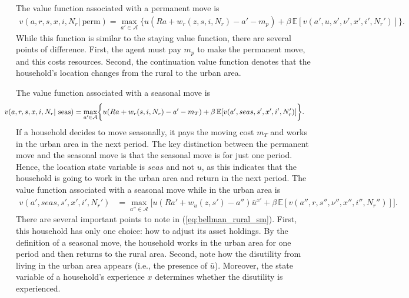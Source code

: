 \documentclass[12pt,pdftex]{article}
\begin{document}
The value function associated with a permanent move is
\begin{align}
v(a, r, s, x, i, N_r | \ \mbox{perm})  = \max_{a'\in \mathcal{A}} \bigg\{ u(Ra + w_r(z, s, i, N_r) - a' - m_{p} )  + \beta \, \mathbb{E} [v(a',u, s',\nu', x', i',N_r')] \bigg\}.
\nonumber
\end{align}
While this function is similar to the staying value function, there are several points of difference. First, the agent must pay $m_p$ to make the permanent move, and this costs resources. Second, the continuation value function denotes that the household's location changes from the rural to the urban area.

The value function associated with a seasonal move is
\begin{align}
\hspace{-0.60cm}v(a, r, s, x, i, N_r | \ \mbox{seas}) = \max_{a'\in \mathcal{A}}&\bigg\{ u(Ra + w_r(s, i, N_r) - a' - m_T ) + \beta \, \mathbb{E} [v(a',seas, s', x', i', N_r')] \bigg\}.
\label{eq:bellman_rural_seas_move}
\end{align}
If a household decides to move seasonally, it pays the moving cost $m_T$ and works in the urban area in the next period. The key distinction between the permanent move and the seasonal move is that the seasonal move is for just one period. Hence, the location state variable is $seas$ and not $u$, as this indicates that the household is going to work in the urban area and return in the next period. The value function associated with a seasonal move while in the urban area is
\begin{align}
v(a',seas, s',x', i',N_r')&=  \max_{a''\in \mathcal{A}}\bigg[ u(Ra' + w_u(z, s') - a'')\bar u^{x'} + \beta \, \mathbb{E} [v(a'',r, s'', \nu'', x'', i'',N_r'')] \bigg].
\label{eq:bellman_rural_sm}
\end{align}
There are several important points to note in (\ref{eq:bellman_rural_sm}). First, this household has only one choice: how to adjust its asset holdings. By the definition of a seasonal move, the household works in the urban area for one period and then returns to the rural area. Second, note how the disutility from living in the urban area appears (i.e., the presence of $\bar u$). Moreover, the state variable of a household's experience $x$ determines whether the disutility is experienced.
\end{document}
